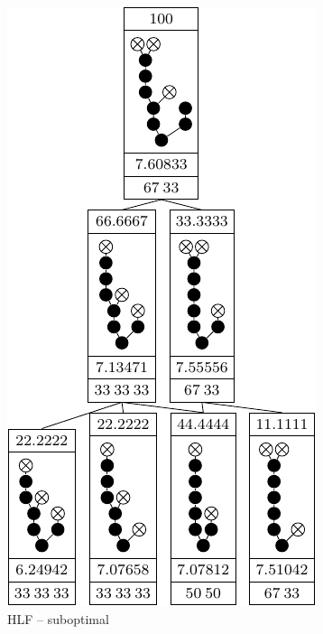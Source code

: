 \begin{figure}[ht]
  \centering
  \begin{subfigure}{.45\linewidth}
    \centering
    \includegraphics{p3/hlf_not_optimal/0012446788_subopt.pdf}
    \caption{HLF -- suboptimal}
  \end{subfigure}
  \begin{subfigure}{.45\linewidth}
    \centering

\end{subfigure}
\end{figure}
